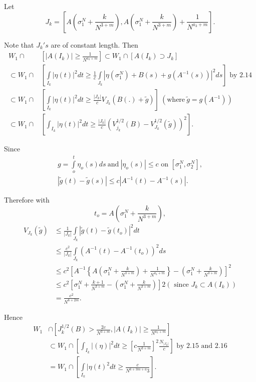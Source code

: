 Let 
$$
J_k = \left[ A (\sigma_{1}^{N} + \frac{k}{N^{3+m}}), A(\sigma_{1}^{N} +
  \frac{k}{N^{3+m}}) + \frac{1}{N^{a_{3} + m}}\right]. 
$$

Note that $J_k 's $ are of constant length. Then
\begin{align*}
  W_1 \cap &\left[ | A(I_k)| \geq \frac{1}{N^{a_{3}+m}}\right] \subset 
  W_1 \cap [A (I_k) \supset J_k ] \\
  \subset W_1 \cap& \left[ \int\limits_{I_{k}}| \eta (t) |^2 dt \geq
  \frac{1}{c} \int\limits_{J_{k}} | \eta (\sigma_{1}^{N}) + B (s) +
  g(A^{-1} (s)) |^2 ds \right] \text{ by 2.14}\\ 
  \subset W_1 \cap & \left[\int\limits_{I_{k}} | \eta (t) |^2 dt \geq
    \frac{|J_k|}{c}V_{J_{k}}(B (.) + \tilde{g}) \right]
  ~(\text{where}~ \tilde{g}= g(A^{-1 })) \\ 
  \subset W_1 \cap & \left[ \int_{I_{k}} | \eta (t) |^2 dt \geq \frac{| J _k
    |}{c} \left(V_{j_k}^{1/2}(B)-V_{J_{k}}^{1/2} (
    \tilde{g})\right)^2 \right]. \tag{2.15} \label{eq2.15} 
\end{align*}
 
 Since\pageoriginale
\begin{multline*}
  g= \int\limits_o ^t \eta_o (s) ds ~\text{and}~| \eta_o (s) | \leq c
  \text{ on } \left[ \sigma_{1}^{N}, \sigma_{2}^{N}\right],\\ 
  | \tilde {g}(t) - \tilde{g}(s)| \leq c |A^{-1}(t) - A^{-1}(s)|.
\end{multline*}
 
 Therefore with
 $$
 t_o  = A \left( \sigma_{1}^{N} + \frac{k}{N^{3+m}}\right),
 $$
 \begin{align*}
   V_{J_{k}}(\tilde{g}) &\leq \frac{1}{| J_{k}|} \int\limits_{J_{k}} |
   \tilde{g}(t) - \tilde{g}(t_o) |^2 dt\\ 
   &\leq \frac{c^2}{| J_{k}|} \int\limits_{J_{k}} (A^{-1}(t) - A^{-1} (t_o))^2 ds\\
   &\leq c^2 \left[ A^{-1}\left\{ A\left(\sigma_{1}^{N} +
     \frac{k}{N^{3+m}}\right) + 
     \frac{1}{N^{a_{3}+m}} \right\} - \left(\sigma_{1}^{N} +
     \frac{k}{N^{3+m}}\right)\right]^2\\ 
   &\leq c^2 [\sigma_{1}^{N} + \frac{k+1}{N^{3+m}} - (\sigma_{1}^{N} +
     \frac{k}{N^{3+m}})]2 (\text{ since } J_k \subset A(I_k)) \\
   & = \frac{c^2}{N^{6+2m}}. \tag{2.16}\label{eq2.16}
 \end{align*}

 Hence
 \begin{align*}
   W_1 &\cap \left[J_k^{1/2} (B) > \frac{2c}{N^{3+m}}, | A (I_k) | \geq
     \frac{1}{N^{a_3 +m}} \right]  \tag{2.17}\label{eq2.17}\\ 
   & \subset W_1 \cap \left[ \int_{I_{k}} | (\eta ) |^2 dt \geq \left[c
       \frac{1}{N^{3+m}}\right]^2 \frac{N_{| J_{k}|}}{c}\right]  
   \text{ by 2.15 and 2.16} \\
   & = W_1 \cap \left[ \int\limits_{I_{k}} | \eta (t) ^2 dt \geq
     \frac{c}{N^{6+3 m+a}3}\right]. 
 \end{align*}\pageoriginale
 
